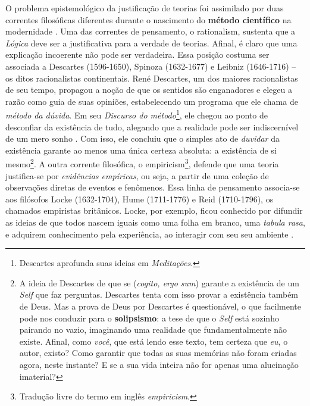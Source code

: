 \documentclass[./main.tex]{subfiles}
\begin{document}
\par O problema epistemológico da justificação de teorias foi assimilado por duas correntes filosóficas diferentes durante o nascimento do \textbf{método científico} na modernidade \cite{sep-rationalism-empiricism}. Uma das correntes de pensamento, o \gls{rationalism}, sustenta que a \textit{Lógica} deve ser a justificativa para a verdade de teorias. Afinal, é claro que uma explicação incoerente não pode ser verdadeira. Essa posição costuma ser associada a Descartes (1596-1650), Spinoza (1632-1677) e Leibniz (1646-1716) -- os ditos racionalistas continentais. René Descartes, um dos maiores racionalistas de seu tempo, propagou a noção de que os sentidos são enganadores e elegeu a razão como guia de suas opiniões, estabelecendo um programa que ele chama de \textit{método da dúvida}. Em seu \textit{Discurso do método}\footnote{Descartes aprofunda suas ideias em \textit{Meditações}.}, ele chegou ao ponto de desconfiar da existência de tudo, alegando que a realidade pode ser indiscernível de um mero sonho \cite{descartes2008discurso}. Com isso, ele concluiu que o simples ato de \textit{duvidar} da existência garante ao menos uma única certeza absoluta: a existência de si mesmo\footnote{A ideia de Descartes de que se  (\textit{cogito, ergo sum}) garante a existência de um \textit{Self} que faz perguntas. Descartes tenta com isso provar a existência também de Deus. Mas a prova de Deus por Descartes é questionável, o que facilmente pode nos conduzir para o \textbf{solipsismo}: a tese de que o \textit{Self} está sozinho pairando no vazio, imaginando uma realidade que fundamentalmente não existe. Afinal, como \textit{você}, que está lendo esse texto, tem certeza que \textit{eu}, o autor, existo? Como garantir que todas as suas memórias não foram criadas agora, neste instante?  E se a sua vida inteira não for apenas uma alucinação imaterial?}. A outra corrente filosófica, o \gls{empiricism}\footnote{Tradução livre do termo em inglês \textit{empiricism}.}, defende que uma teoria justifica-se por \textit{evidências empíricas}, ou seja, a partir de uma coleção de observações diretas de eventos e fenômenos. Essa linha de pensamento associa-se aos filósofos Locke (1632-1704), Hume (1711-1776) e Reid (1710-1796), os chamados empiristas britânicos. Locke, por exemplo, ficou conhecido por difundir as ideias de que todos nascem iguais como uma folha em branco, uma \textit{tabula rasa}, e adquirem conhecimento pela experiência, ao interagir com seu seu ambiente \cite{sep-locke}. 
\end{document}
